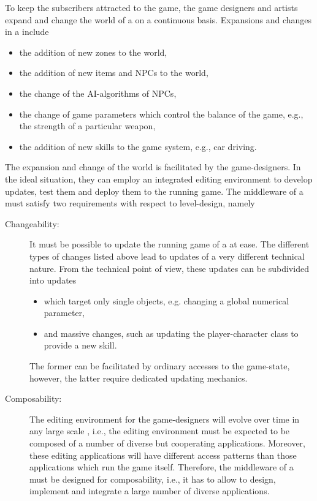 \documentclass[a4paper, 10pt]{book}
\begin{document}
To keep the subscribers attracted to the game, the game designers and artists
expand and change the world of a \MMORG on a continuous basis.
Expansions and changes in a \MMORG include
\begin{itemize}
    \item the addition of new zones to the world,
    \item the addition of new items and NPCs to the world,
    \item the change of the AI-algorithms of NPCs,
    \item the change of game parameters which control the balance
        of the game, e.g., the strength of a particular weapon,
    \item the addition of new skills to the game system, e.g., car
        driving.
\end{itemize}
%
The expansion and change of the world is facilitated by the
game-designers. In the ideal situation, they can employ an integrated
editing environment to develop updates, test them and deploy them to
the running game. 
%
The middleware of a \MMORG must satisfy two requirements with respect
to level-design, namely
\begin{description} 
    \item[Changeability:] It must be possible to update the
        running game of a \MMORG at ease. The different types of changes
        listed above lead to updates of a very different technical
        nature. From the technical point of view, these updates can be
        subdivided into updates 
        \begin{itemize}
            \item which target only single objects, e.g. changing a global
                numerical parameter,
            \item and massive changes, such as updating the player-character
                class to provide a new skill.
        \end{itemize}
        The former can be facilitated by ordinary accesses to the
        game-state, however, the latter require dedicated updating
        mechanics. 
    \item[Composability:] The editing environment for the game-designers
        will evolve over time in any large scale \MMORG, i.e., the editing
        environment must be expected to be composed of a number of diverse
        but cooperating applications. Moreover, these editing applications
        will have different access patterns than those applications which
        run the game itself. Therefore, the middleware of a \MMORG must be
        designed for composability, i.e., it has to allow to design,
        implement and integrate a large number of diverse applications. 
\end{description}
\end{document}
